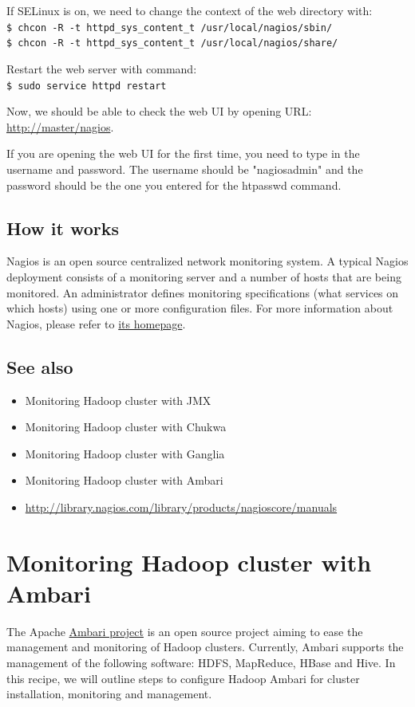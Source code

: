 If SELinux is on, we need to change the context of the web directory with:\\
\verb|$ chcon -R -t httpd_sys_content_t /usr/local/nagios/sbin/| \\
\verb|$ chcon -R -t httpd_sys_content_t /usr/local/nagios/share/|

Restart the web server with command:\\
\verb|$ sudo service httpd restart|

Now, we should be able to check the web UI by opening URL: \url{http://master/nagios}.

If you are opening the web UI for the first time, you need to type in the username and password. The username should be "nagiosadmin" and the password should be the one you entered for the htpasswd command.

\subsection*{How it works}
Nagios is an open source centralized network monitoring system. A typical Nagios deployment consists of a monitoring server and a number of hosts that are being monitored. An administrator defines monitoring specifications (what services on which hosts) using one or more configuration files. For more information about Nagios, please refer to \href{http://www.nagios.org}{its homepage}.
\subsection*{See also}
\begin{itemize}
  \item Monitoring Hadoop cluster with JMX
  \item Monitoring Hadoop cluster with Chukwa 
  \item Monitoring Hadoop cluster with Ganglia
  \item Monitoring Hadoop cluster with Ambari
  \item \url{http://library.nagios.com/library/products/nagioscore/manuals}
\end{itemize}

\section{Monitoring Hadoop cluster with Ambari}
The Apache \href{http://incubator.apache.org/ambari/}{Ambari project} is an open source project aiming to ease the management and monitoring of Hadoop clusters. Currently, Ambari supports the management of the following software: HDFS, MapReduce, HBase and Hive. In this recipe, we will outline steps to configure Hadoop Ambari for cluster installation, monitoring and management.
